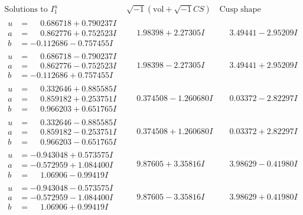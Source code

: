 \documentclass[1p]{elsarticle_modified}
\theoremstyle{definition}
\newcommand{\I}{\sqrt{-1}}
\begin{document}
$$\begin{array}{c|c|c}  
\text{Solutions to }I^u_{1}& \I (\text{vol} + \sqrt{-1}CS) & \text{Cusp shape}\\
 \hline 
\begin{aligned}
u &= \phantom{-}0.686718 + 0.790237 I \\
a &= \phantom{-}0.862776 + 0.752523 I \\
b &= -0.112686 - 0.757455 I\end{aligned}
 & \phantom{-}1.98398 + 2.27305 I & \phantom{-}3.49441 - 2.95209 I \\ \hline\begin{aligned}
u &= \phantom{-}0.686718 - 0.790237 I \\
a &= \phantom{-}0.862776 - 0.752523 I \\
b &= -0.112686 + 0.757455 I\end{aligned}
 & \phantom{-}1.98398 - 2.27305 I & \phantom{-}3.49441 + 2.95209 I \\ \hline\begin{aligned}
u &= \phantom{-}0.332646 + 0.885585 I \\
a &= \phantom{-}0.859182 + 0.253751 I \\
b &= \phantom{-}0.966203 + 0.651765 I\end{aligned}
 & \phantom{-}0.374508 - 1.260680 I & \phantom{-}0.03372 - 2.82297 I \\ \hline\begin{aligned}
u &= \phantom{-}0.332646 - 0.885585 I \\
a &= \phantom{-}0.859182 - 0.253751 I \\
b &= \phantom{-}0.966203 - 0.651765 I\end{aligned}
 & \phantom{-}0.374508 + 1.260680 I & \phantom{-}0.03372 + 2.82297 I \\ \hline\begin{aligned}
u &= -0.943048 + 0.573575 I \\
a &= -0.572959 + 1.084400 I \\
b &= \phantom{-}1.06906 - 0.99419 I\end{aligned}
 & \phantom{-}9.87605 + 3.35816 I & \phantom{-}3.98629 - 0.41980 I \\ \hline\begin{aligned}
u &= -0.943048 - 0.573575 I \\
a &= -0.572959 - 1.084400 I \\
b &= \phantom{-}1.06906 + 0.99419 I\end{aligned}
 & \phantom{-}9.87605 - 3.35816 I & \phantom{-}3.98629 + 0.41980 I \\ \hline\begin{aligned}

\end{aligned}
\end{array}$$
\end{document}
